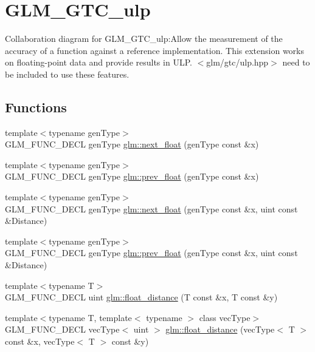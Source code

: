 \hypertarget{group__gtc__ulp}{
\section{GLM\_\-GTC\_\-ulp}
\label{group__gtc__ulp}
}


Collaboration diagram for GLM\_\-GTC\_\-ulp:Allow the measurement of the accuracy of a function against a reference implementation. This extension works on floating-point data and provide results in ULP. $<$glm/gtc/ulp.hpp$>$ need to be included to use these features.  
\subsection*{Functions}
\begin{CompactItemize}
\item 
{\footnotesize template$<$typename genType$>$ }\\GLM\_\-FUNC\_\-DECL genType \hyperlink{group__gtc__ulp_g5ec4457d254b7b960db32f10d219fd6f}{glm::next\_\-float} (genType const \&x)
\item 
{\footnotesize template$<$typename genType$>$ }\\GLM\_\-FUNC\_\-DECL genType \hyperlink{group__gtc__ulp_gf1c61fb2a0092a4222dae424dd96aeb0}{glm::prev\_\-float} (genType const \&x)
\item 
{\footnotesize template$<$typename genType$>$ }\\GLM\_\-FUNC\_\-DECL genType \hyperlink{group__gtc__ulp_g686013928fd7c76c5f100b84483b1f51}{glm::next\_\-float} (genType const \&x, uint const \&Distance)
\item 
{\footnotesize template$<$typename genType$>$ }\\GLM\_\-FUNC\_\-DECL genType \hyperlink{group__gtc__ulp_ge55d449df292398361ccecad1cc5ead4}{glm::prev\_\-float} (genType const \&x, uint const \&Distance)
\item 
{\footnotesize template$<$typename T$>$ }\\GLM\_\-FUNC\_\-DECL uint \hyperlink{group__gtc__ulp_g4cb4468c9654077d40266d039158206b}{glm::float\_\-distance} (T const \&x, T const \&y)
\item 
{\footnotesize template$<$typename T, template$<$ typename $>$ class vecType$>$ }\\GLM\_\-FUNC\_\-DECL vecType$<$ uint $>$ \hyperlink{group__gtc__ulp_g421b0584182815a9e9e64d74361e7409}{glm::float\_\-distance} (vecType$<$ T $>$ const \&x, vecType$<$ T $>$ const \&y)
\end{CompactItemize}



